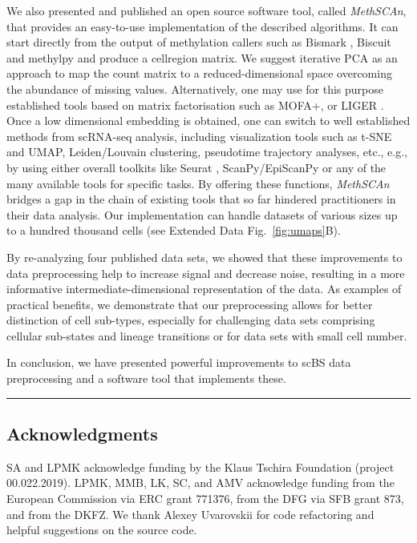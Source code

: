 \documentclass[10pt]{article}
\begin{document}
We also presented and published an open source software tool, called \textit{MethSCAn}, that provides an easy-to-use implementation of the described algorithms.
It can start directly from the output of methylation callers such as Bismark \citep{bismark}, Biscuit \citep{biscuit} and methylpy \citep{methylpy} and produce a cell\texttimes region matrix.
We suggest iterative PCA as an approach to map the count matrix to a reduced-dimensional space overcoming the abundance of missing values.
Alternatively, one may use for this purpose established tools based on matrix factorisation such as MOFA+, \citep[][included in our benchmarks]{argelaguet2020mofa} or LIGER \citep{welch2019single}.
Once a low dimensional embedding is obtained, one can switch to well established methods from scRNA-seq analysis, including visualization tools such as t-SNE and UMAP, Leiden/Louvain clustering, pseudotime trajectory analyses, etc., e.g., by using either overall toolkits like Seurat \citep{seurat5}, ScanPy/EpiScanPy \citep{Wolf_2018,danese2021episcanpy} or any of the many available tools for specific tasks.
By offering these functions, \textit{MethSCAn} bridges a gap in the chain of existing tools that so far hindered practitioners in their data analysis.
Our implementation can handle datasets of various sizes up to a hundred thousand cells (see Extended Data Fig.~\ref{fig:umaps}B).

By re-analyzing four published data sets, we showed that these improvements to data preprocessing help to increase signal and decrease noise, resulting in a more informative intermediate-dimensional representation of the data.
As examples of practical benefits, we demonstrate that our preprocessing allows for better distinction of cell sub-types, especially for challenging data sets comprising cellular sub-states and lineage transitions or for data sets with small cell number.

In conclusion, we have presented powerful improvements to scBS data preprocessing and a software tool that implements these.

\vspace{1.4ex}
\noindent\hfil\rule{.6\columnwidth}{.2pt}\hfil


\subsection*{Acknowledgments}
SA and LPMK acknowledge funding by the Klaus Tschira Foundation (project 00.022.2019).
LPMK, MMB, LK, SC, and AMV acknowledge funding from the European Commission via ERC grant 771376, from the DFG via SFB grant 873, and from the DKFZ.
We thank Alexey Uvarovskii for code refactoring and helpful suggestions on the source code.
\end{document}
